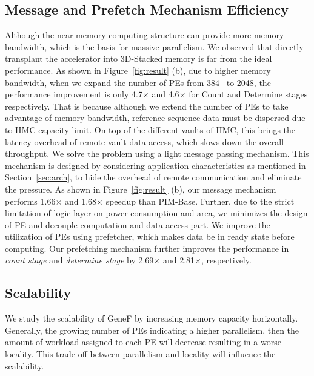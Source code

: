 \documentclass[9pt,conference]{IEEEtran}
\begin{document}
\subsection{Message and Prefetch Mechanism Efficiency}
Although the near-memory computing structure can provide more memory bandwidth, which is the basis for massive parallelism. We observed that directly transplant the accelerator into 3D-Stacked memory is far from the ideal performance. As shown in Figure~\ref{fig:result} (b), due to higher memory bandwidth, when we expand the number of PEs from 384~\cite{yuanrong} to 2048, the performance improvement is only 4.7$\times$ and 4.6$\times$ for Count and Determine stages respectively. That is because although we extend the number of PEs to take advantage of memory bandwidth, reference sequence data must be dispersed due to HMC capacity limit. On top of the different vaults of HMC, this brings the latency overhead of remote vault data access, which slows down the overall throughput. We solve the problem using a light message passing mechanism. This mechanism is designed by considering application characteristics as mentioned in Section~\ref{sec:arch}, to hide the overhead of remote communication and eliminate the pressure. As shown in Figure~\ref{fig:result} (b), our message mechanism performs 1.66$\times$ and 1.68$\times$ speedup than PIM-Base. Further, due to the strict limitation of logic layer on power consumption and area, we minimizes the design of PE and decouple computation and data-access part. We improve the utilization of PEs using prefetcher, which makes data be in ready state before computing. Our prefetching mechanism further improves the performance in \textit{count stage} and \textit{determine stage} by 2.69$\times$ and 2.81$\times$, respectively.

\subsection{Scalability}
We study the scalability of GeneF by increasing memory capacity horizontally. Generally, the growing number of PEs indicating a higher parallelism, then the amount of workload assigned to each PE will decrease resulting in a worse locality. This trade-off between parallelism and locality will influence the scalability.
\end{document}
